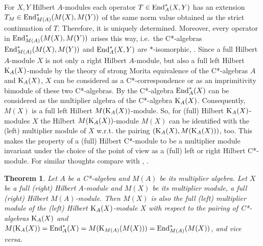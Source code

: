 \documentclass{amsart}
\newtheorem{thm}{Theorem}[section]
\theoremstyle{definition}
\begin{document}
For $X,Y$ Hilbert $A$-modules each operator $T \in {\rm End}_A^*(X,Y)$ has an extension $T_M \in {\rm End}_{M(A)}^*(M(X),M(Y))$ of the same norm value obtained as the strict continuation of $T$. Therefore, it is uniquely determined. Moreover, every operator in ${\rm End}_{M(A)}^*(M(X),M(Y))$ arises this way, i.e.~the C*-algebras ${\rm End}_{M(A)}^*(M(X),M(Y))$ and ${\rm End}_A^*(X,Y)$ are $*$-isomorphic, \cite[Thm.~2.3]{BG_2004}. Since a full Hilbert $A$-module $X$ is not only a right Hilbert $A$-module, but also a full left Hilbert ${\rm K}_A(X)$-module by the theory of strong Morita equivalence of the C*-algebras $A$ and ${\rm K}_A(X)$, $X$ can be considered as a C*-correspondence or as an imprimitivity bimodule of these two C*-algebras. By \cite{Kasparov_1980} the C*-algebra ${\rm End}_A^*(X)$ can be considered as the multiplier algebra of the C*-algebra ${\rm K}_A(X)$. Consequently, $M(X)$ is a full left Hilbert $M({\rm K}_A(X))$-module. So, for (full) Hilbert ${\rm K}_A(X)$-modules $X$ the Hilbert $M({\rm K}_A(X))$-module $M(X)$ can be identified with the (left) multiplier module of $X$ w.r.t. the pairing $({\rm K}_A(X), M({\rm K}_A(X)))$, too. This makes the property of a (full) Hilbert C*-module to be a multiplier module invariant under the choice of the point of view as a (full) left or right Hilbert C*-module. For similar thoughts compare with \cite[pp.~20-21, (a)-(b)]{BG_2004}, \cite[Props.~1.3, 1.6, Remark]{EchRae_1995}.

\begin{thm}
Let $A$ be a C*-algebra and $M(A)$ be its multiplier algebra. Let $X$ be a full (right) Hilbert $A$-module and $M(X)$ be its multiplier module, a full (right) Hilbert $M(A)$-module. Then $M(X)$ is also the full (left) multiplier module of the (left) Hilbert ${\rm K}_A(X)$-module $X$ with respect to the pairing of C*-algebras ${\rm K}_A(X)$ and $M({\rm K}_A(X))={\rm End}_A^*(X)=M({\rm K}_{M(A)}(M(X)))={\rm End}_{M(A)}^*(M(X))$, and vice versa. 
\end{thm}
\end{document}
